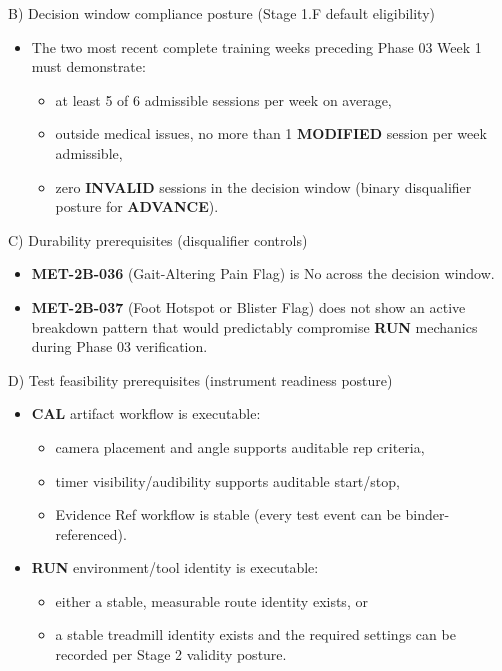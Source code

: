 \documentclass[10pt]{article}
\begin{document}
B) Decision window compliance posture (Stage 1.F default eligibility)

\begin{itemize}
\item The two most recent complete training weeks preceding Phase 03 Week 1 must demonstrate:
  \begin{itemize}
  \item at least 5 of 6 admissible sessions per week on average,
  \item outside medical issues, no more than 1 \textbf{MODIFIED} session per week admissible,
  \item zero \textbf{INVALID} sessions in the decision window (binary disqualifier posture for \textbf{ADVANCE}).
  \end{itemize}
\end{itemize}

C) Durability prerequisites (disqualifier controls)

\begin{itemize}
\item \textbf{MET-2B-036} (Gait-Altering Pain Flag) is No across the decision window.
\item \textbf{MET-2B-037} (Foot Hotspot or Blister Flag) does not show an active breakdown pattern that would predictably compromise \textbf{RUN} mechanics during Phase 03 verification.
\end{itemize}

D) Test feasibility prerequisites (instrument readiness posture)

\begin{itemize}
\item \textbf{CAL} artifact workflow is executable:
  \begin{itemize}
  \item camera placement and angle supports auditable rep criteria,
  \item timer visibility/audibility supports auditable start/stop,
  \item Evidence Ref workflow is stable (every test event can be binder-referenced).
  \end{itemize}
\item \textbf{RUN} environment/tool identity is executable:
  \begin{itemize}
  \item either a stable, measurable route identity exists, or
  \item a stable treadmill identity exists and the required settings can be recorded per Stage 2 validity posture.
  \end{itemize}
\end{itemize}
\end{document}
